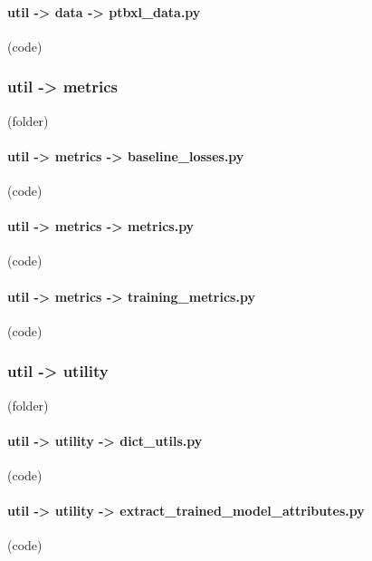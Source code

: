 \begin{myparindent}{0pt}
\noindent\paragraph[ptbxl\_data.py]{util -> data -> ptbxl\_data.py} (code)

\noindent\subsubsection[metrics]{util -> metrics} (folder)
\noindent\paragraph[baseline\_losses.py]{util -> metrics -> baseline\_losses.py} (code)

\noindent\paragraph[metrics.py]{util -> metrics -> metrics.py} (code)

\noindent\paragraph[training\_metrics.py]{util -> metrics -> training\_metrics.py} (code)

\noindent\subsubsection[utility]{util -> utility} (folder)
\noindent\paragraph[dict\_utils.py]{util -> utility -> dict\_utils.py} (code)

\noindent\paragraph[extract\_trained\_model\_attributes.py]{util -> utility -> extract\_trained\_model\_attributes.py} (code)


\end{myparindent}
